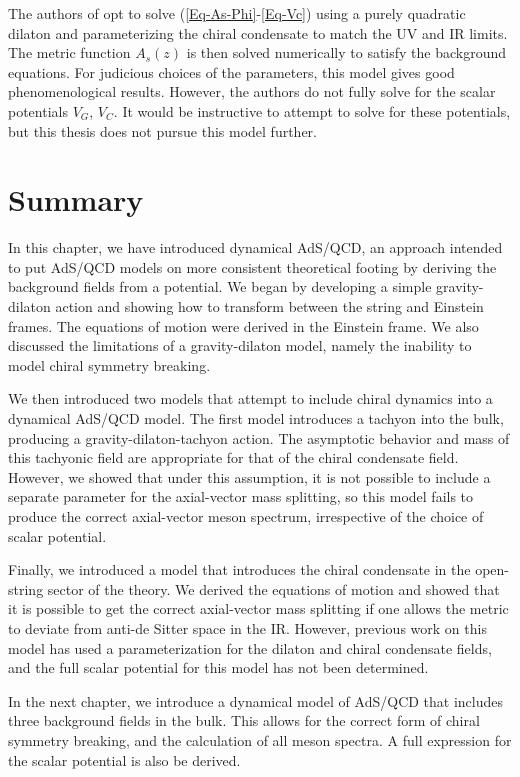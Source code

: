 The authors of \cite{Li2013,Li2013a} opt to solve (\ref{Eq-As-Phi}-\ref{Eq-Vc}) using a purely quadratic dilaton and parameterizing the chiral condensate to match the UV and IR limits. 
The metric function $A_s(z)$ is then solved numerically to satisfy the background equations.
For judicious choices of the parameters, this model gives good phenomenological results.
However, the authors do not fully solve for the scalar potentials $V_G$, $V_C$.
It would be instructive to attempt to solve for these potentials, but this thesis does not pursue this model further.

\section{Summary}
In this chapter, we have introduced dynamical AdS/QCD, an approach intended to put AdS/QCD models on more consistent theoretical footing by deriving the background fields from a potential.
We began by developing a simple gravity-dilaton action and showing how to transform between the string and Einstein frames.
The equations of motion were derived in the Einstein frame.
We also discussed the limitations of a gravity-dilaton model, namely the inability to model chiral symmetry breaking.

We then introduced two models that attempt to include chiral dynamics into a dynamical AdS/QCD model. 
The first model introduces a tachyon into the bulk, producing a gravity-dilaton-tachyon action. 
The asymptotic behavior and mass of this tachyonic field are appropriate for that of the chiral condensate field.
However, we showed that under this assumption, it is not possible to include a separate parameter for the axial-vector mass splitting, so this model fails to produce the correct axial-vector meson spectrum, irrespective of the choice of scalar potential.

Finally, we introduced a model that introduces the chiral condensate in the open-string sector of the theory. 
We derived the equations of motion and showed that it is possible to get the correct axial-vector mass splitting if one allows the metric to deviate from anti-de Sitter space in the IR.
However, previous work on this model has used a parameterization for the dilaton and chiral condensate fields, and the full scalar potential for this model has not been determined.

In the next chapter, we introduce a dynamical model of AdS/QCD that includes three background fields in the bulk.
This allows for the correct form of chiral symmetry breaking, and the calculation of all meson spectra. 
A full expression for the scalar potential is also be derived.






